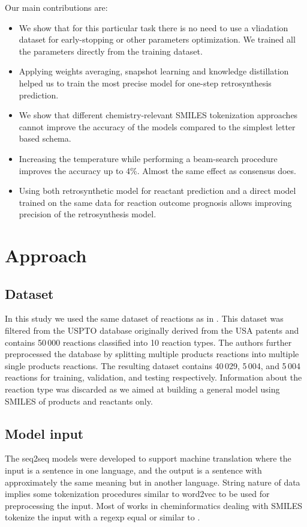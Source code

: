\documentclass{article}
\begin{document}
Our main contributions are:
\begin{itemize}
\item We show that for this particular task there is no need to use a vliadation dataset for early-stopping or other parameters optimization. We trained all the parameters directly from the training dataset.
\item Applying weights averaging, snapshot learning and knowledge distillation helped us to train the most precise model for one-step retrosynthesis prediction.
\item We show that different chemistry-relevant SMILES tokenization approaches cannot improve the accuracy of the models compared to the simplest letter based schema. 
\item Increasing the temperature while performing a beam-search procedure improves the accuracy up to 4\%. Almost the same effect as consensus does. 
\item Using both retrosynthetic model for reactant prediction and a direct model trained on the same data for reaction outcome prognosis allows improving precision of the retrosynthesis model.
\end{itemize}

\section{Approach}
\label{sec:approach}

\subsection{Dataset}

In this study we used the same dataset of reactions as in \cite{Pande}. 
This dataset was filtered from the USPTO database\cite{Lowe} originally derived from the USA patents and 
contains 50\,000 reactions classified into 10 reaction types\cite{Schneider}. The authors\cite{Pande} further preprocessed the database by 
splitting multiple products reactions into multiple single products reactions. The resulting dataset contains 40\,029, 5\,004, and 5\,004 reactions for training, validation, and testing respectively. Information about the reaction type 
was discarded as we aimed at building a general model using SMILES of products and reactants only.


\subsection{Model input}
The seq2seq models were developed to support machine translation where the input is a sentence in one language, and the output is a sentence with approximately the same meaning but in another language. String nature of data implies some tokenization procedures similar to word2vec to be used for preprocessing the input. Most of works in cheminformatics dealing with SMILES tokenize the input with a regexp equal or similar to \cite{SchwallerTranslation}. 
\end{document}
